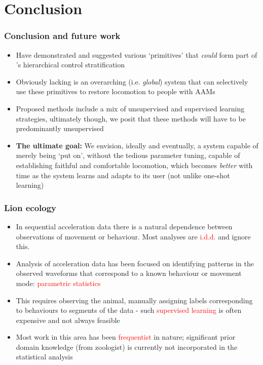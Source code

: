 \documentclass[aspectratio=169]{beamer}
\begin{document}
\section{Conclusion}
\begin{frame}
    \frametitle{{\bf Conclusion and future work}}
    \begin{itemize}
        \item Have demonstrated and suggested various `primitives' that \emph{could} form part of
            \citet{tucker2015control}'s hierarchical control stratification
        \item Obviously lacking is an overarching (i.e. \emph{global}) system that can selectively use these primitives
            to restore locomotion to people with AAMs
        \item Proposed methods include a mix of unsupervised and supervised learning strategies, ultimately though, we
            posit that these methods will have to be predominantly unsupervised 
        \item {\bf The ultimate goal:} We envision, ideally and eventually, a system capable of merely being `put on',
            without the tedious parameter tuning, capable of establishing faithful and comfortable locomotion, which
            becomes \emph{better} with time as the system learns and adapts to its user (not unlike one-shot
            learning)
    \end{itemize}
\end{frame}


\iffalse %
\begin{frame}
    \frametitle{Lion ecology}

    \begin{itemize}
        \item In sequential acceleration data there is a natural dependence between observations of movement or behaviour. Most analyses are \textcolor{red}{i.d.d.} and ignore this.
        \item Analysis of acceleration data
            has been focused on identifying patterns in the observed waveforms that correspond to a known behaviour or movement mode: \textcolor{red}{parametric statistics}
        \item This requires observing the animal, manually assigning labels corresponding to behaviours to segments of the data - such \textcolor{red}{supervised learning} is often expensive and not always feasible
        \item Most work in this area has been \textcolor{red}{frequentist} in nature; significant prior domain knowledge (from zoologist) is currently not incorporated in the statistical analysis
    \end{itemize}

\end{frame}
\end{document}
